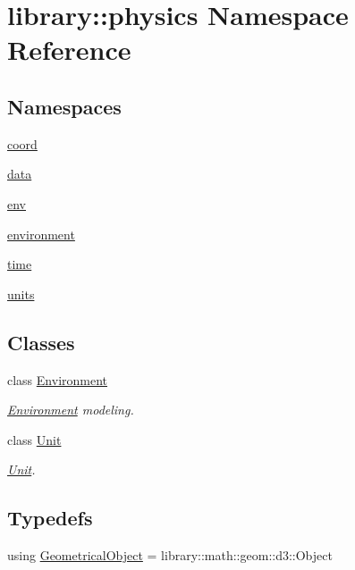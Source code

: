 \hypertarget{namespacelibrary_1_1physics}{}\section{library\+:\+:physics Namespace Reference}
\label{namespacelibrary_1_1physics}
\subsection*{Namespaces}
\begin{DoxyCompactItemize}
\item 
 \hyperlink{namespacelibrary_1_1physics_1_1coord}{coord}
\item 
 \hyperlink{namespacelibrary_1_1physics_1_1data}{data}
\item 
 \hyperlink{namespacelibrary_1_1physics_1_1env}{env}
\item 
 \hyperlink{namespacelibrary_1_1physics_1_1environment}{environment}
\item 
 \hyperlink{namespacelibrary_1_1physics_1_1time}{time}
\item 
 \hyperlink{namespacelibrary_1_1physics_1_1units}{units}
\end{DoxyCompactItemize}
\subsection*{Classes}
\begin{DoxyCompactItemize}
\item 
class \hyperlink{classlibrary_1_1physics_1_1_environment}{Environment}
\begin{DoxyCompactList}\small\item\em \hyperlink{classlibrary_1_1physics_1_1_environment}{Environment} modeling. \end{DoxyCompactList}\item 
class \hyperlink{classlibrary_1_1physics_1_1_unit}{Unit}
\begin{DoxyCompactList}\small\item\em \hyperlink{classlibrary_1_1physics_1_1_unit}{Unit}. \end{DoxyCompactList}\end{DoxyCompactItemize}
\subsection*{Typedefs}
\begin{DoxyCompactItemize}
\item 
using \hyperlink{namespacelibrary_1_1physics_a188a48c84b083aea628a2bd98f6b8e0a}{Geometrical\+Object} = library\+::math\+::geom\+::d3\+::\+Object
\end{DoxyCompactItemize}
